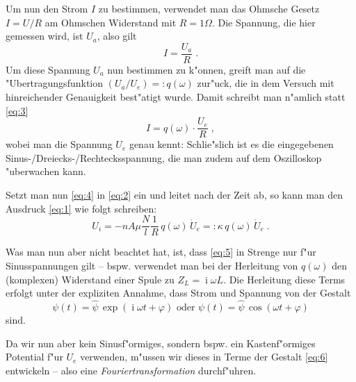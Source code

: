 \message{ !name(uebertr01.tex)}\documentclass[a4paper,12pt,draft]{article}
\newcommand{\I}{\ensuremath{\operatorname{i}}}
\newcommand{\abs}[0]{\bigskip\noindent}
\begin{document}
Um nun den Strom $I$ zu bestimmen, verwendet man das Ohmsche Gesetz $I
= U / R$ am Ohmschen Widerstand mit $R = 1 \Omega$. Die Spannung, die
hier gemessen wird, ist $U_a$, also gilt
\begin{equation}
  \label{eq:3}
  I = \frac{U_a}{R} \;.
\end{equation}
Um diese Spannung $U_a$ nun bestimmen zu k"onnen, greift man auf die
"Ubertragungsfunktion $(U_a / U_e) = :q(\omega)$ zur"uck, die in dem
Versuch mit hinreichender Genauigkeit best"atigt wurde. Damit schreibt
man n"amlich statt \eqref{eq:3}
\begin{equation}
  \label{eq:4}
  I = q(\omega) \cdot \frac{U_e}{R} \;,
\end{equation}
wobei man die Spannung $U_e$ genau kennt: Schlie"slich ist es die
eingegebenen Sinus-/Dreiecks-/Rechtecksspannung, die man zudem auf dem
Oszilloskop "uberwachen kann.

Setzt man nun  \eqref{eq:4} in \eqref{eq:2} ein und leitet nach der
Zeit ab, so kann man den Ausdruck \eqref{eq:1} wie folgt schreiben:
\begin{equation}
  \label{eq:5}
  U_i = - n A \mu \frac{N}{l} \frac{1}{R} \, q(\omega) \, \dot U_e =:
  \kappa \, q(\omega) \, \dot U_e \;.
\end{equation}

Was man nun aber nicht beachtet hat, ist, dass \eqref{eq:5} in Strenge
nur f"ur Sinusspannungen gilt -- bspw. verwendet man bei der
Herleitung von $q(\omega)$ den (komplexen) Widerstand einer Spule zu $Z_L = \I
\omega L$. Die Herleitung diese Terms erfolgt unter der expliziten
Annahme, dass Strom und Spannung von der Gestalt 
\begin{equation}
  \label{eq:6}
\psi(t) = \hat \psi \,\exp( \I \omega t + \varphi)  \text{ oder }
\psi(t) = \hat \psi \, \cos( \omega t + \varphi )
\end{equation}
sind.

\abs
Da wir nun aber kein Sinusf"ormiges, sondern bspw. ein Kastenf"ormiges
Potential f"ur $U_e$ verwenden, m"ussen wir dieses in Terme der
Gestalt \eqref{eq:6} entwickeln -- also eine
\emph{Fouriertransformation} durchf"uhren.
\end{document}
